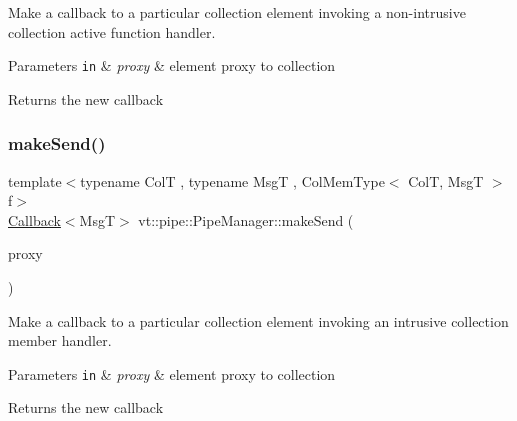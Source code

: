 Make a callback to a particular collection element invoking a non-\/intrusive collection active function handler. 


\begin{DoxyParams}[1]{Parameters}
\mbox{\tt in}  & {\em proxy} & element proxy to collection\\
\hline
\end{DoxyParams}
\begin{DoxyReturn}{Returns}
the new callback 
\end{DoxyReturn}
\mbox{\label{structvt_1_1pipe_1_1_pipe_manager_a87e25e6a0151c0a9a48b58e6f4679b02}} 
\subsubsection{\texorpdfstring{make\+Send()}{makeSend()}\hspace{0.1cm}{\footnotesize\ttfamily [5/6]}}
{\footnotesize\ttfamily template$<$typename ColT , typename MsgT , Col\+Mem\+Type$<$ Col\+T, Msg\+T $>$ f$>$ \\
\hyperlink{namespacevt_a57b238783d05de96bc2c4027f7073b7f}{Callback}$<$MsgT$>$ vt\+::pipe\+::\+Pipe\+Manager\+::make\+Send (\begin{DoxyParamCaption}\item[{typename Col\+T\+::\+Proxy\+Type}]{proxy }\end{DoxyParamCaption})}



Make a callback to a particular collection element invoking an intrusive collection member handler. 


\begin{DoxyParams}[1]{Parameters}
\mbox{\tt in}  & {\em proxy} & element proxy to collection\\
\hline
\end{DoxyParams}
\begin{DoxyReturn}{Returns}
the new callback 
\end{DoxyReturn}
\mbox{\label{structvt_1_1pipe_1_1_pipe_manager_aa5d48a3b64820bec240a6a61bdfb4524}} 
